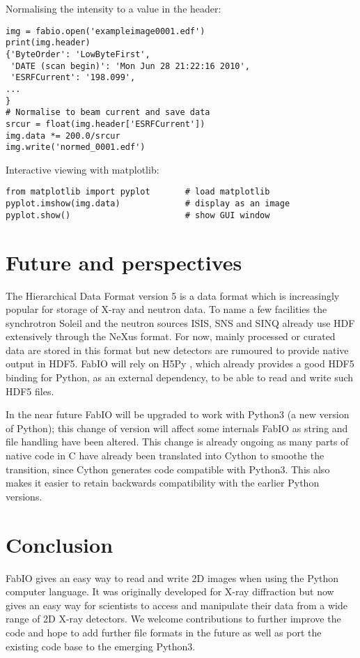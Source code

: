 \documentclass[preprint]{iucr}
\begin{document}
Normalising the intensity to a value in the header:\\
\begin{verbatim}
img = fabio.open('exampleimage0001.edf')
print(img.header)
{'ByteOrder': 'LowByteFirst',
 'DATE (scan begin)': 'Mon Jun 28 21:22:16 2010',
 'ESRFCurrent': '198.099',
...
}
# Normalise to beam current and save data
srcur = float(img.header['ESRFCurrent'])
img.data *= 200.0/srcur
img.write('normed_0001.edf')
\end{verbatim}

Interactive viewing with matplotlib:\\
\begin{verbatim}
from matplotlib import pyplot       # load matplotlib 
pyplot.imshow(img.data)             # display as an image
pyplot.show()                       # show GUI window
\end{verbatim}


\section{Future and perspectives}

The Hierarchical Data Format version 5 \cite{hdf5} is a data format which is
increasingly popular for storage of X-ray and neutron data. To name a few
facilities the synchrotron Soleil\cite{tub05} and the neutron sources
ISIS, SNS and SINQ already use HDF extensively through the NeXus\cite{nexus} format.
For now, mainly processed or curated data are stored in this format but new detectors are
rumoured to provide native output in HDF5.
FabIO will rely on H5Py \cite{h5py}, which already
provides a good HDF5 binding for Python, as an external dependency, to be able
to read and write such HDF5 files.

In the near future FabIO will be upgraded to work with Python3 (a new version of 
Python); this change of version will affect some internals FabIO as string and 
file handling have been altered.
This change is already ongoing as many parts of native code in C have already
been translated into Cython \cite{cython} to smoothe the transition, since 
Cython generates code compatible with Python3. 
This also makes it easier to retain backwards compatibility with the earlier
Python versions. 

\section{Conclusion}

FabIO gives an easy way to read and write 2D images when using the
Python computer language.
It was originally developed for X-ray diffraction but now gives
an easy way for scientists to access and manipulate
their data from a wide range of 2D X-ray detectors.
We welcome contributions to further improve the code and hope to add
further file formats in the future as well as port the existing code base 
to the emerging Python3.
\end{document}
